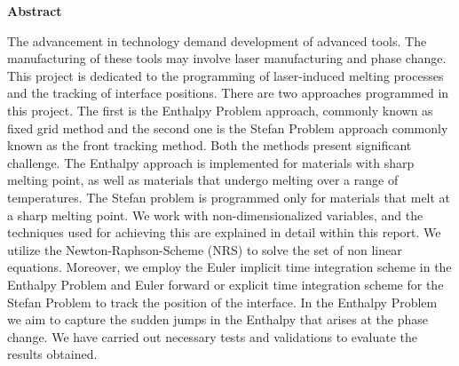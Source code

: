 \thispagestyle{empty}
\vspace*{1.0cm}

\begin{center}
    \textbf{Abstract}
\end{center}

\vspace*{0.5cm}

\noindent
The advancement in technology demand development of advanced tools. The manufacturing of these tools may involve laser manufacturing and phase change. This project is dedicated to the programming of laser-induced melting processes and the tracking of interface positions. There are two approaches programmed in this project. 
The first is the Enthalpy Problem approach, commonly known as fixed grid method and the second one is the Stefan Problem approach commonly known as the front tracking method. Both the methods present significant challenge. The Enthalpy approach is implemented for materials with sharp melting point, as well as materials that undergo melting over a range of temperatures. The Stefan problem is programmed only for materials that melt at a sharp melting point. We work with non-dimensionalized variables, and the techniques used for achieving this are explained in detail within this report. We utilize the Newton-Raphson-Scheme (NRS) to solve the set of non linear equations. Moreover, we employ the Euler implicit time integration scheme in the Enthalpy Problem and Euler forward or explicit time integration scheme for the Stefan Problem to track the position of the interface. In the Enthalpy Problem we aim to capture the sudden jumps in the Enthalpy that arises at the phase change. We have carried out necessary tests and validations to evaluate the results obtained.